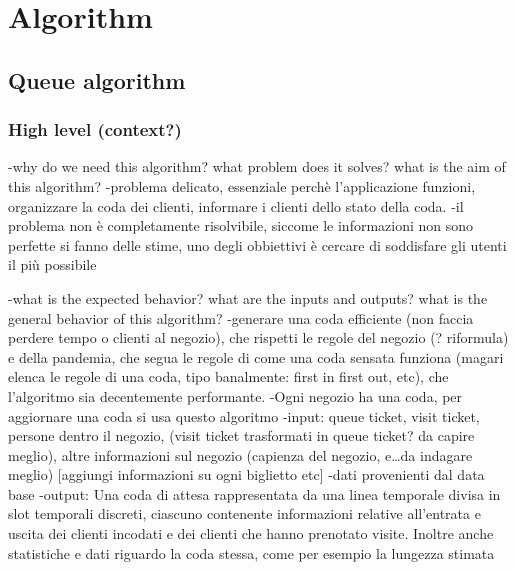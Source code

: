 \section{Algorithm}
\label{sect:algorithm}

\subsection{Queue algorithm}
\label{subsect:queuealgorithm}

\subsubsection{High level (context?)}
\label{subsubsect:highlevel}

-why do we need this algorithm? what problem does it solves? what is the aim of this algorithm?
    -problema delicato, essenziale perchè l'applicazione funzioni, organizzare la coda dei clienti, informare i clienti dello stato della coda.
    -il problema non è completamente risolvibile, siccome le informazioni non sono perfette si fanno delle stime, uno degli obbiettivi è cercare di soddisfare gli utenti il più possibile

-what is the expected behavior? what are the inputs and outputs? what is the general behavior of this algorithm?
    -generare una coda efficiente (non faccia perdere tempo o clienti al negozio), che rispetti le regole del negozio (? riformula) e della pandemia, che segua le regole di come una coda sensata funziona (magari elenca le regole di una coda, tipo banalmente: first in first out, etc), che l'algoritmo sia decentemente performante.
    -Ogni negozio ha una coda, per aggiornare una coda si usa questo algoritmo
    -input: queue ticket, visit ticket, persone dentro il negozio, (visit ticket trasformati in queue ticket? da capire meglio), altre informazioni sul negozio (capienza del negozio, e\dots da indagare meglio) [aggiungi informazioni su ogni biglietto etc]
    -dati provenienti dal data base
    -output: Una coda di attesa rappresentata da una linea temporale divisa in slot temporali discreti, ciascuno contenente informazioni relative all'entrata e uscita dei clienti incodati e dei clienti che hanno prenotato visite. Inoltre anche statistiche e dati riguardo la coda stessa, come per esempio la lungezza stimata

